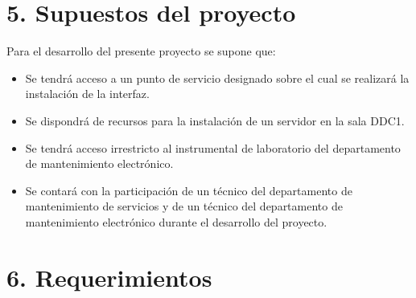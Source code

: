 \documentclass[
11pt, %
]{charter}
\begin{document}
\section{5. Supuestos del proyecto}
\label{sec:supuestos}


Para el desarrollo del presente proyecto se supone que:

\begin{itemize}
	\item Se tendrá acceso a un punto de servicio designado sobre el cual se realizará la instalación de la interfaz.
	\item Se dispondrá de recursos para la instalación de un servidor en la sala DDC1.
	\item Se tendrá acceso irrestricto al instrumental de laboratorio del departamento de mantenimiento electrónico.
	\item Se contará con la participación de un técnico del departamento de mantenimiento de servicios y de un técnico del departamento de mantenimiento electrónico durante el desarrollo del proyecto.
\end{itemize}



\section{6. Requerimientos}
\label{sec:requerimientos}
\end{document}
